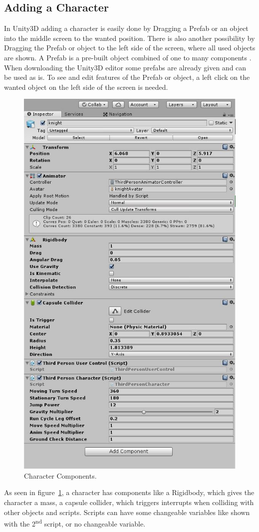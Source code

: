 \documentclass[conference]{IEEEtran}
\begin{document}
\subsection{Adding a Character}

In Unity3D adding a character is easily done by Dragging a Prefab or an object into the middle screen to the wanted position. There is also another possibility by Dragging the Prefab or object to the left side of the screen, where all used objects are shown. A Prefab is a pre-built object combined of one to many components \cite{b2}. When downloading the Unity3D editor some prefabs are already given and can be used as is.
To see and edit features of the Prefab or object, a left click on the wanted object on the left side of the screen is needed. 

\begin{figure}[htbp]
  \includegraphics[width=.4\textwidth]{pictures/character_controls_character_components}
  \caption{Character Components.}
  \label{fig:character_controls_character_components}
\end{figure}

As seen in figure~\ref{fig:character_controls_character_components}, a character has components like a Rigidbody, which gives the character a mass, a capsule collider, which triggers interrupts when colliding with other objects and scripts. Scripts can have some changeable variables like shown with the 2\textsuperscript{nd} script, or no changeable variable.

\lstset{
basicstyle=\ttfamily\small,
numbers=left,
breaklines=true,
numberstyle=\tiny,
numbersep=5pt,
tabsize=3
}
\end{document}
